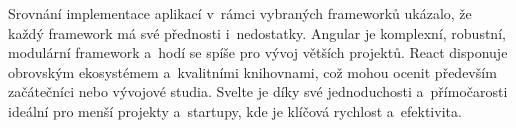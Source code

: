 
Srovnání implementace aplikací v~rámci vybraných frameworků ukázalo, že každý framework má své přednosti i~nedostatky. 
Angular je komplexní, robustní, modulární framework a~hodí se spíše pro vývoj větších projektů. 
React disponuje obrovským ekosystémem a~kvalitními knihovnami, což mohou ocenit především začátečníci nebo vývojové studia. 
Svelte je díky své jednoduchosti a~přímočarosti ideální pro menší projekty a~startupy, kde je klíčová rychlost a~efektivita.